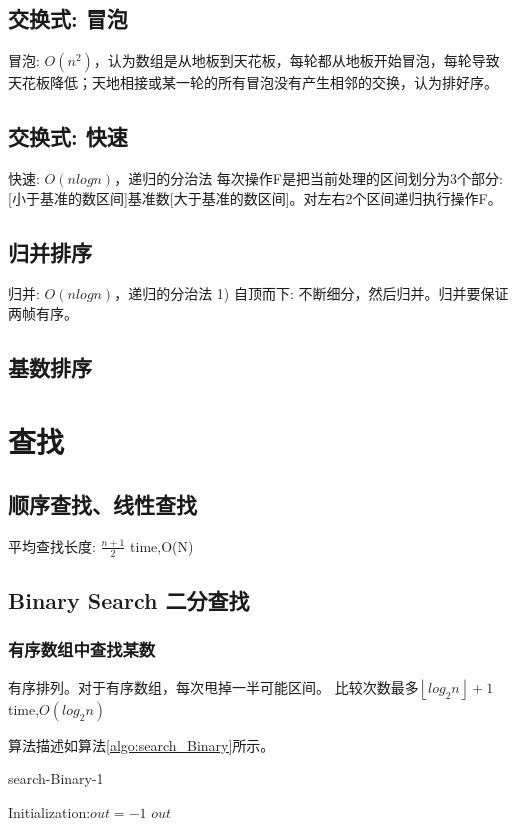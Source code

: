 \documentclass[UTF8]{../computerUniverse}
\begin{document}
\subsection{交换式: 冒泡}
冒泡: $O(n^2)$，认为数组是从地板到天花板，每轮都从地板开始冒泡，每轮导致天花板降低；天地相接或某一轮的所有冒泡没有产生相邻的交换，认为排好序。


\subsection{交换式: 快速}    
快速: $O(nlogn)$，递归的分治法
每次操作F是把当前处理的区间划分为3个部分: [小于基准的数区间]基准数[大于基准的数区间]。对左右2个区间递归执行操作F。


\subsection{归并排序}

归并: $O(nlogn)$，递归的分治法
1) 自顶而下: 不断细分，然后归并。归并要保证两帧有序。


\subsection{基数排序}


\section{查找}


\subsection{顺序查找、线性查找}
平均查找长度: $\frac{n+1}{2}$
time,O(N)


\subsection{Binary Search 二分查找}

\subsubsection{有序数组中查找某数}
有序排列。对于有序数组，每次甩掉一半可能区间。
比较次数最多$\left\lfloor log_2n\right\rfloor +1$
time,$O(log_2n)$



算法描述如算法\ref{algo:search_Binary}所示。

      \begin{algorithm}[h]%
        \caption{search-Binary-1}\label{algo:search_Binary_1}
        \SetAlgoLined
        \KwIn{ordered range set $S = [l,r)$, the search number $t$}
        Initialization:$out = -1$\;
        \KwRet $out$\;
      \end{algorithm}
\end{document}
